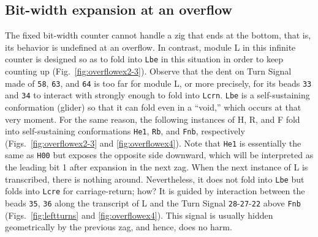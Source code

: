 \documentclass[twocolumn]{svjour3}
\begin{document}
\subsection{Bit-width expansion at an overflow}
The fixed bit-width counter cannot handle a zig that ends at the bottom, that is, its behavior is undefined at an overflow.
In contrast, module L in this infinite counter is designed so as to fold into \texttt{Lbe} in this situation in order to keep counting up (Fig.~\ref{fig:overflowex2-3}).
Observe that the dent on Turn Signal made of \texttt{58}, \texttt{63}, and \texttt{64} is too far for module L, or more precisely, for its beads \texttt{33} and \texttt{34} to interact with strongly enough to fold into \texttt{Lcrn}.
\texttt{Lbe} is a self-sustaining conformation (glider) so that it can fold even in a ``void,'' which occurs at that very moment.
For the same reason, the following instances of H, R, and F fold into self-sustaining conformations \texttt{He1}, \texttt{Rb}, and \texttt{Fnb}, respectively (Figs.~\ref{fig:overflowex2-3} and \ref{fig:overflowex4}).
Note that \texttt{He1} is essentially the same as \texttt{H00} but exposes the opposite side downward, which will be interpreted as the leading bit 1 after expansion in the next zag.
When the next instance of L is transcribed, there is nothing around.
Nevertheless, it does not fold into \texttt{Lbe} but folds into \texttt{Lcre} for carriage-return; how?
It is guided by interaction between the beads \texttt{35}, \texttt{36} along the transcript of L and the Turn Signal \texttt{28}{-}\texttt{27}{-}\texttt{22} above \texttt{Fnb} (Figs.~\ref{fig:leftturns} and \ref{fig:overflowex4}).
This signal is usually hidden geometrically by the previous zag, and hence, does no harm.
\end{document}
